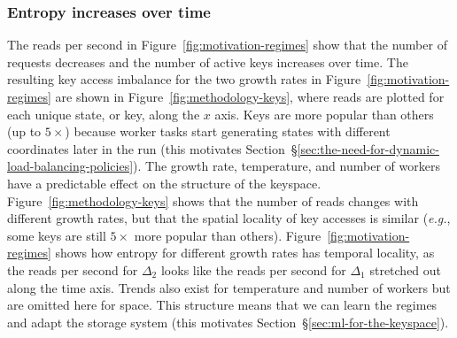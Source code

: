 \subsubsection*{Entropy increases over time} The reads per second in
Figure~\ref{fig:motivation-regimes} show that the number of requests decreases
and the number of active keys increases over time. The resulting key access
imbalance for the two growth rates in Figure~\ref{fig:motivation-regimes} are
shown in Figure~\ref{fig:methodology-keys}, where reads are plotted for each
unique state, or key, along the \(x\) axis. Keys are more popular than others
(up to \(5\times\)) because worker tasks start generating states with different
coordinates later in the run (this motivates
Section~\S\ref{sec:the-need-for-dynamic-load-balancing-policies}).  The growth
rate, temperature, and number of workers have a predictable effect on the
structure of the keyspace.  Figure~\ref{fig:methodology-keys} shows that the
number of reads changes with different growth rates, but that the spatial
locality of key accesses is similar ({\it e.g.}, some keys are still
\(5\times\) more popular than others).  Figure~\ref{fig:motivation-regimes}
shows how entropy for different growth rates has temporal locality, as the
reads per second for \(\Delta_2\) looks like the reads per second for
\(\Delta_1\) stretched out along the time axis.  Trends also exist for
temperature and number of workers but are omitted here for space. This
structure means that we can learn the regimes and adapt the storage system
(this motivates Section~\S\ref{sec:ml-for-the-keyspace}).
